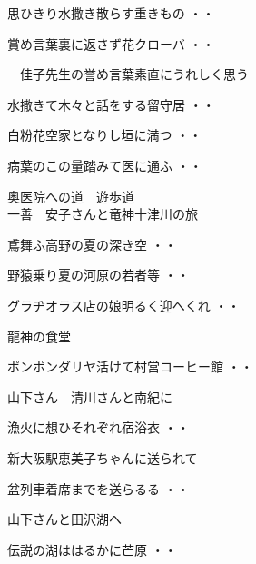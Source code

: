 \begin{shiika}思ひきり水撒き散らす重きもの
\hfill{・・}\end{shiika}
\begin{shiika}賞め言葉裏に返さず花クローバ
\hfill{・・}\end{shiika}
\qquad\qquad\qquad　佳子先生の誉め言葉素直にうれしく思う
\begin{shiika}水撒きて木々と話をする留守居
\hfill{・・}\end{shiika}
\begin{shiika}白粉花空家となりし垣に満つ
\hfill{・・}\end{shiika}
\begin{shiika}病葉のこの量踏みて医に通ふ
\hfill{・・}\end{shiika}
\qquad\qquad\qquad 奥医院への道　遊歩道\\
\vspace{0.6cm}
\noindent
一善　安子さんと竜神十津川の旅
\begin{shiika}鳶舞ふ高野の夏の深き空
\hfill{・・}\end{shiika}
\begin{shiika}野猿乗り夏の河原の若者等
\hfill{・・}\end{shiika}
\begin{shiika}グラヂオラス店の娘明るく迎へくれ
\hfill{・・}\end{shiika}
\qquad\qquad\qquad 龍神の食堂\\
\begin{shiika}ポンポンダリヤ活けて村営コーヒー館
\hfill{・・}\end{shiika}
\vspace{0.6cm}
山下さん　清川さんと南紀に
\begin{shiika}漁火に想ひそれぞれ宿浴衣
\hfill{・・}\end{shiika}
\vspace{0.6cm}
新大阪駅恵美子ちゃんに送られて
\begin{shiika}盆列車着席までを送らるる
\hfill{・・}\end{shiika}
\vspace{0.6cm}
山下さんと田沢湖へ
\begin{shiika}伝説の湖ははるかに芒原
\hfill{・・}\end{shiika}

